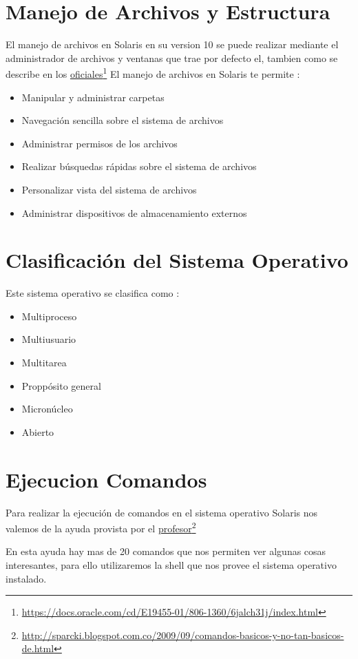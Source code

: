 \documentclass[paper=a4, fontsize=12pt]{article} 		%
\newcommand\fnurl[2]{%
\href{#2}{#1}\footnote{\url{#2}}%
}
\numberwithin{equation}{section}						%
\numberwithin{table}{section} 							%
\begin{document}
\section{Manejo de Archivos y Estructura}
El manejo de archivos en Solaris en su version 10 se puede realizar mediante  el administrador de archivos y ventanas que trae por defecto el, tambien como se describe en los \fnurl{oficiales}{https://docs.oracle.com/cd/E19455-01/806-1360/6jalch31j/index.html} El manejo de archivos en Solaris te permite :
\begin{itemize}
\item Manipular y administrar carpetas 
\item Navegación sencilla sobre el sistema de archivos
\item Administrar permisos de los archivos 
\item Realizar búsquedas rápidas sobre el sistema de archivos
\item Personalizar vista del sistema de archivos
\item Administrar dispositivos de almacenamiento externos
\end{itemize}
\section{Clasificación del Sistema Operativo}
Este sistema operativo se clasifica como : 
\begin{itemize}
\item Multiproceso 
\item Multiusuario
\item Multitarea
\item Proppósito general
\item Micronúcleo
\item Abierto
\end{itemize}

\section{Ejecucion Comandos}
Para realizar la ejecución de comandos en el sistema operativo Solaris nos valemos de la ayuda provista por el \fnurl{profesor}{http://sparcki.blogspot.com.co/2009/09/comandos-basicos-y-no-tan-basicos-de.html}

En esta ayuda hay mas de 20 comandos que nos permiten ver algunas cosas interesantes, para ello utilizaremos la shell que nos provee el sistema operativo instalado. 
\end{document}
